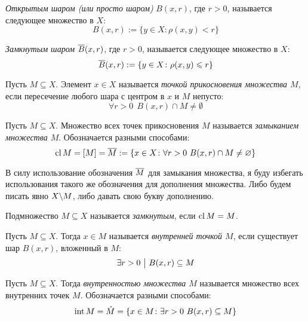 \begin{definition}
	\textit{Открытым шаром (или просто шаром)} $B(x, r)$, где $r > 0$, называется следующее множество в $X$:
	\[
		B(x, r) := \{y \in X \colon \rho(x, y) < r\}
	\]
\end{definition}

\begin{definition}
	\textit{Замкнутым шаром} $\overline{B}(x, r)$, где $r > 0$, называется следующее множество в $X$:
	\[
		\overline{B}(x, r) := \{y \in X \colon \rho(x, y) \leqslant r\}
	\]
\end{definition}

\begin{definition}
	Пусть $M \subseteq X$. Элемент $x \in X$ называется \textit{точкой прикосновения множества $M$}, если пересечение любого шара с центром в $x$ и $M$ непусто:
	\[
		\forall r > 0\ \ B(x, r) \cap M \neq \emptyset
	\]
\end{definition}

\begin{definition}
	Пусть $M \subseteq X$. Множество всех точек прикосновения $M$ называется \textit{замыканием множества $M$}. Обозначается разными способами:
	\[
		\operatorname{cl} M = [M] = \overline{M} := \{x \in X \colon \forall r > 0\ B(x, r) \cap M \neq \varnothing\}
	\]
\end{definition}

\begin{anote}
	В силу использование обозначения $\overline{M}$ для замыкания множества, я буду избегать использования такого же обозначения для дополнения множества. Либо будем писать явно $X \backslash M$, либо давать свою букву дополнению.
\end{anote}

\begin{definition}
	Подмножество $M \subseteq X$ называется \textit{замкнутым}, если $\operatorname{cl} M = M$.
\end{definition}

\begin{definition}
	Пусть $M \subseteq X$. Тогда $x \in M$ называется \textit{внутренней точкой $M$}, если существует шар $B(x, r)$, вложенный в $M$:
	\[
		\exists r > 0 \ \big|\  B(x, r) \subseteq M
	\]
\end{definition}

\begin{definition}
	Пусть $M \subseteq X$. Тогда \textit{внутренностью множества $M$} называется множество всех внутренних точек $M$. Обозначается разными способами:
	\[
		\operatorname{int} M = \mathring{M} = \{x \in M \colon \exists r > 0\ B(x, r) \subseteq M\}
	\]
\end{definition}


